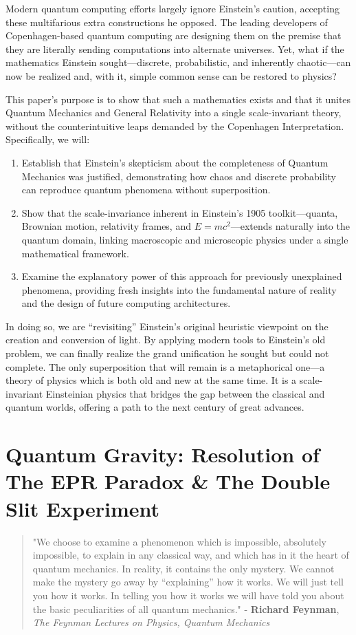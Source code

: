 \documentclass{article}
\begin{document}
Modern quantum computing efforts largely ignore Einstein’s caution, accepting these multifarious extra constructions he opposed. The leading developers of Copenhagen-based quantum computing are designing them on the premise that they are literally sending computations into alternate universes. Yet, what if the mathematics Einstein sought—discrete, probabilistic, and inherently chaotic—can now be realized and, with it, simple common sense can be restored to physics?

This paper’s purpose is to show that such a mathematics exists and that it unites Quantum Mechanics and General Relativity into a single scale-invariant theory, without the counterintuitive leaps demanded by the Copenhagen Interpretation. Specifically, we will:
\begin{enumerate}
    \item Establish that Einstein’s skepticism about the completeness of Quantum Mechanics was justified, demonstrating how chaos and discrete probability can reproduce quantum phenomena without superposition.
    \item Show that the scale-invariance inherent in Einstein’s 1905 toolkit—quanta, Brownian motion, relativity frames, and $E=mc^2$—extends naturally into the quantum domain, linking macroscopic and microscopic physics under a single mathematical framework.
    \item Examine the explanatory power of this approach for previously unexplained phenomena, providing fresh insights into the fundamental nature of reality and the design of future computing architectures.
\end{enumerate}

In doing so, we are “revisiting” Einstein’s original heuristic viewpoint on the creation and conversion of light. By applying modern tools to Einstein’s old problem, we can finally realize the grand unification he sought but could not complete. The only superposition that will remain is a metaphorical one—a theory of physics which is both old and new at the same time. It is a scale-invariant Einsteinian physics that bridges the gap between the classical and quantum worlds, offering a path to the next century of great advances.

\section*{Quantum Gravity: Resolution of The EPR Paradox \& The Double Slit Experiment}
\begin{quotation}
    "We choose to examine a phenomenon which is impossible, absolutely impossible, to explain in any classical way, and which has in it the heart of quantum mechanics. In reality, it contains the only mystery. We cannot make the mystery go away by “explaining” how it works. We will just tell you how it works. In telling you how it works we will have told you about the basic peculiarities of all quantum mechanics."
    \newline
    - \textbf{Richard Feynman}, \textit{The Feynman Lectures on Physics, Quantum Mechanics}\cite{FeynmanLectures}
\end{quotation}
\end{document}
